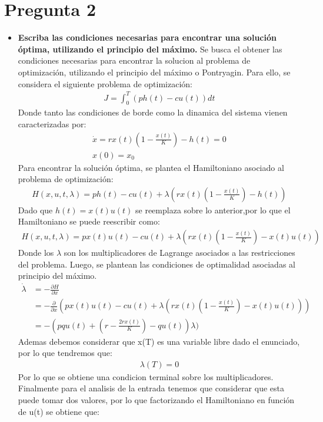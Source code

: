\section{Pregunta 2}
\begin{itemize}
	\item \textbf{Escriba las condiciones necesarias para encontrar una solución óptima, utilizando el principio del máximo.}
Se busca el obtener las condiciones necesarias para encontrar la solucion al problema de optimización, utilizando el principio del máximo o Pontryagin. Para ello, se considera el siguiente problema de optimización:
\begin{align}
	 J = \int_{0}^{T} (ph(t) - cu(t))dt
\end{align}
Donde tanto las condiciones de borde como la dinamica del sistema vienen caracterizadas por:
\begin{align}
	\dot{x} = rx(t) \left(1 - \frac{x(t)}{K}\right) - h(t) = 0\\
	x(0) = x_0
\end{align}
Para encontrar la solución óptima, se plantea el Hamiltoniano asociado al problema de optimización:
\begin{align}
	H(x,u,t,\lambda) = ph(t) - cu(t) + \lambda \left( rx(t) \left(1 - \frac{x(t)}{K}\right) - h(t) \right)
\end{align}
Dado que $h(t)=x(t)u(t)$ se reemplaza sobre lo anterior,por lo que el Hamiltoniano se puede reescribir como:
\begin{align}
	H(x,u,t,\lambda) = px(t)u(t) - cu(t) + \lambda \left( rx(t) \left(1 - \frac{x(t)}{K}\right) - x(t)u(t) \right)
\end{align}
Donde los $\lambda$ son los multiplicadores de Lagrange asociados a las restricciones del problema. Luego, se plantean las condiciones de optimalidad asociadas al principio del máximo.
\begin{align}
	\dot{\lambda}&= -\frac{\partial H}{\partial x}\\ 
	             &= -\frac{\partial}{\partial x} \left( px(t)u(t) - cu(t) + \lambda \left( rx(t) \left(1 - \frac{x(t)}{K}\right) - x(t)u(t) \right) \right)\\
				 &= -(pqu(t) + \left(r - \frac{2rx(t)}{K}\right)-qu(t))\lambda) 
\end{align}
Ademas debemos considerar que x(T) es una variable libre dado el enunciado, por lo que tendremos que:
\begin{align}
	\lambda(T) = 0 
\end{align}
Por lo que se obtiene una condicion terminal sobre los multiplicadores. Finalmente para el analisis de la entrada tenemos que considerar que esta puede tomar dos valores, por lo que factorizando el Hamiltoniano en función de u(t) se obtiene que:

\end{itemize}
